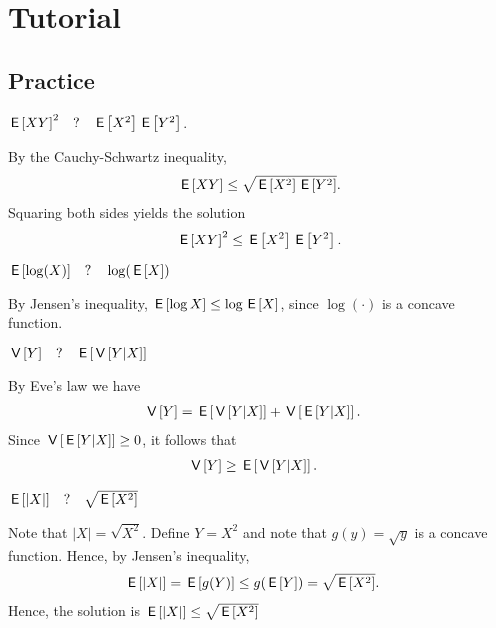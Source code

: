 \section{Tutorial}
\label{sec:tutorial}


\subsection{Practice}



\begin{exercise}
$\E{XY}^2 \quad?\quad \E{X^2}\E{Y^2}$.
\begin{solution}
By the Cauchy-Schwartz inequality,
\begin{align}
    \E{XY} \leq \sqrt{\E{X^2}\E{Y^2}}.
\end{align}
Squaring both sides yields the solution
\begin{align}
    \E{XY}^2 \leq \E{X^2}\E{Y^2}.
\end{align}
\end{solution}
\end{exercise}


\begin{exercise}
$\E{\log (X) } \quad?\quad \log(\E{X})$
\begin{solution}
By Jensen's inequality, $\E{\log X } \leq \log \E{X}$, since $\log(\cdot)$ is a concave function.
\end{solution}
\end{exercise}

\begin{exercise}
$\V{Y} \quad?\quad \E{\V{Y|X}}$
\begin{solution}
By Eve's law we have
\begin{align}
    \V{Y} &= \E{\V{Y|X}} + \V{\E{Y|X}}.
\end{align}
Since $\V{\E{Y|X}} \geq 0$, it follows that
\begin{align}
    \V{Y} &\geq \E{\V{Y|X}}.
\end{align}
\end{solution}
\end{exercise}

\begin{exercise}
$\E{|X|} \quad?\quad \sqrt{\E{X^2}}$
\begin{solution}
Note that $|X| = \sqrt{X^2}$. Define $Y = X^2$ and note that $g(y) = \sqrt{y}$ is a concave function. Hence, by Jensen's inequality,
\begin{align}
    \E{|X|} &= \E{g(Y)} \leq g(\E{Y}) = \sqrt{\E{X^2}}.
\end{align}
Hence, the solution is $\E{|X|} \leq \sqrt{\E{X^2}}$
\end{solution}
\end{exercise}

